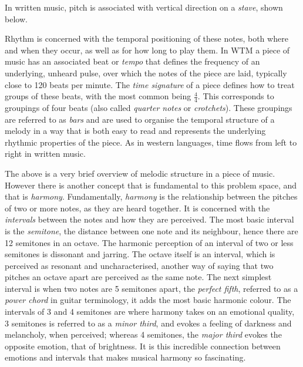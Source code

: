 \documentclass[bsc,singlespacing,logo, parskip, deptreport]{infthesis}
\begin{document}
In written music, pitch is associated with vertical direction on a {\em stave}, shown below.
\begin{center}
\end{center}

Rhythm is concerned with the temporal positioning of these notes, both where and when they occur, as well as for how long to play them. In WTM a piece of music has an associated beat or {\em tempo} that defines the frequency of an underlying, unheard pulse, over which the notes of the piece are laid, typically close to 120 beats per minute. The {\em time signature} of a piece defines how to treat groups of these beats, with the most common being $\frac{4}{4}$. This corresponds to groupings of four beats (also called {\em quarter notes} or {\em crotchets}). These groupings are referred to as {\em bars} and are used to organise the temporal structure of a melody in a way that is both easy to read and represents the underlying rhythmic properties of the piece. As in western languages, time flows from left to right in written music.

The above is a very brief overview of melodic structure in a piece of music. However there is another concept that is fundamental to this problem space, and that is {\em harmony}. Fundamentally, {\em harmony} is the relationship between the pitches of two or more notes, as they are heard together. It is concerned with the {\em intervals} between the notes and how they are perceived. The most basic interval is the {\em semitone}, the distance between one note and its neighbour, hence there are 12 semitones in an octave. The harmonic perception of an interval of two or less semitones is dissonant and jarring. The octave itself is an interval, which is perceived as resonant and uncharacterised, another way of saying that two pitches an octave apart are perceived as the same note. The next simplest interval is when two notes are 5 semitones apart, the {\em perfect fifth}, referred to as a {\em power chord} in guitar terminology, it adds the most basic harmonic colour. The intervals of 3 and 4 semitones are where harmony takes on an emotional quality, 3 semitones is referred to as a {\em minor third}, and evokes a feeling of darkness and melancholy, when perceived; whereas 4 semitones, the {\em major third} evokes the opposite emotion, that of brightness. It is this incredible connection between emotions and intervals that makes musical harmony so fascinating.
\end{document}
